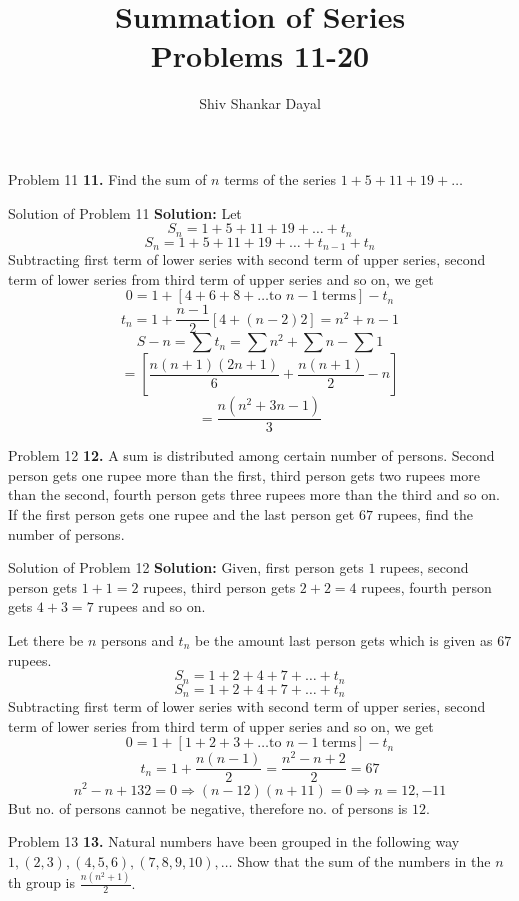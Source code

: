 \documentclass[aspectratio=1610,8pt]{beamer}
\title{Summation of Series\\Problems 11-20}
\author[Shiv Shankar Dayal]{Shiv Shankar Dayal}
\begin{document}
\begin{frame}
  \titlepage
\end{frame}
\begin{frame}{Problem 11}
  \textbf{11.} Find the sum of $n$ terms of the series $1 + 5 + 11 + 19 + \ldots$
\end{frame}
\begin{frame}{Solution of Problem 11}
  \textbf{Solution:} Let
  $$S_n = 1 + 5 + 11 + 19 + \ldots + t_n$$
  $$S_n = 1 + 5 + 11 + 19 + \ldots + t_{n -1} + t_n$$
  Subtracting first term of lower series with second term of upper series, second term of lower series from third term of upper
  series and so on, we get
  $$0 = 1 + [4 + 6 + 8 + \ldots \text{to~}n - 1~\text{terms}] - t_n$$
  $$t_n = 1 + \frac{n - 1}{2}[4 + (n - 2)2] = n^2 + n - 1$$
  $$S-n = \sum t_n = \sum n^2 + \sum n - \sum 1$$
  $$= \left[\frac{n(n + 1)(2n + 1)}{6} + \frac{n(n + 1)}{2} - n\right]$$
  $$= \frac{n(n^2 + 3n - 1)}{3}$$
\end{frame}
\begin{frame}{Problem 12}
  \textbf{12.} A sum is distributed among certain number of persons. Second person gets one rupee more than the first, third person
  gets two rupees more than the second, fourth person gets three rupees more than the third and so on. If the first person gets one
  rupee and the last person get $67$ rupees, find the number of persons.
\end{frame}
\begin{frame}{Solution of Problem 12}
  \textbf{Solution:} Given, first person gets $1$ rupees, second person gets $1 + 1 = 2$ rupees, third person gets $2 + 2 = 4$
  rupees, fourth person gets $4 + 3 = 7$ rupees and so on.

  Let there be $n$ persons and $t_n$ be the amount last person gets which is given as $67$ rupees.
  $$S_n = 1 + 2 + 4 + 7 + \ldots + t_n$$
  $$S_n = 1 + 2 + 4 + 7 + \ldots + t_n$$
  Subtracting first term of lower series with second term of upper series, second term of lower series from third term of upper
  series and so on, we get
  $$0 = 1 + [1 + 2 + 3 + \ldots \text{to~}n - 1~\text{terms}] - t_n$$
  $$t_n = 1 + \frac{n(n - 1)}{2} = \frac{n^2 - n + 2}{2} = 67$$
  $$n^2 - n + 132 = 0 \Rightarrow (n - 12)(n + 11) = 0\Rightarrow n = 12, -11$$
  But no. of persons cannot be negative, therefore no. of persons is $12.$
\end{frame}
\begin{frame}{Problem 13}
  \textbf{13.} Natural numbers have been grouped in the following way $1, (2, 3), (4, 5, 6), (7, 8, 9, 10), \ldots$ Show that the
  sum of the numbers in the $n$th group is $\frac{n(n^2 + 1)}{2}.$
\end{frame}
\end{document}
